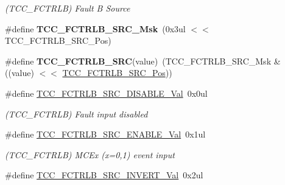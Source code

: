 \begin{DoxyCompactItemize}
\begin{DoxyCompactList}\small\item\em (T\+C\+C\+\_\+\+F\+C\+T\+R\+L\+B) Fault B Source \end{DoxyCompactList}\item 
\hypertarget{group___s_a_m_l21___t_c_c_ga2d51f76f71ee83af0772a637d77e9dd6}{}\#define {\bfseries T\+C\+C\+\_\+\+F\+C\+T\+R\+L\+B\+\_\+\+S\+R\+C\+\_\+\+Msk}~(0x3ul $<$$<$ T\+C\+C\+\_\+\+F\+C\+T\+R\+L\+B\+\_\+\+S\+R\+C\+\_\+\+Pos)\label{group___s_a_m_l21___t_c_c_ga2d51f76f71ee83af0772a637d77e9dd6}

\item 
\hypertarget{group___s_a_m_l21___t_c_c_gaa0837ed1869f63ae3826ee7302d11de3}{}\#define {\bfseries T\+C\+C\+\_\+\+F\+C\+T\+R\+L\+B\+\_\+\+S\+R\+C}(value)~(T\+C\+C\+\_\+\+F\+C\+T\+R\+L\+B\+\_\+\+S\+R\+C\+\_\+\+Msk \& ((value) $<$$<$ \hyperlink{group___s_a_m_l21___t_c_c_ga8cc27791b6546da73f032510287b61d5}{T\+C\+C\+\_\+\+F\+C\+T\+R\+L\+B\+\_\+\+S\+R\+C\+\_\+\+Pos}))\label{group___s_a_m_l21___t_c_c_gaa0837ed1869f63ae3826ee7302d11de3}

\item 
\hypertarget{group___s_a_m_l21___t_c_c_gac3c686f822e3629ffcb2554af6eb2db4}{}\#define \hyperlink{group___s_a_m_l21___t_c_c_gac3c686f822e3629ffcb2554af6eb2db4}{T\+C\+C\+\_\+\+F\+C\+T\+R\+L\+B\+\_\+\+S\+R\+C\+\_\+\+D\+I\+S\+A\+B\+L\+E\+\_\+\+Val}~0x0ul\label{group___s_a_m_l21___t_c_c_gac3c686f822e3629ffcb2554af6eb2db4}

\begin{DoxyCompactList}\small\item\em (T\+C\+C\+\_\+\+F\+C\+T\+R\+L\+B) Fault input disabled \end{DoxyCompactList}\item 
\hypertarget{group___s_a_m_l21___t_c_c_ga5e5e1f08fb8d7f78e5aa11c00637e495}{}\#define \hyperlink{group___s_a_m_l21___t_c_c_ga5e5e1f08fb8d7f78e5aa11c00637e495}{T\+C\+C\+\_\+\+F\+C\+T\+R\+L\+B\+\_\+\+S\+R\+C\+\_\+\+E\+N\+A\+B\+L\+E\+\_\+\+Val}~0x1ul\label{group___s_a_m_l21___t_c_c_ga5e5e1f08fb8d7f78e5aa11c00637e495}

\begin{DoxyCompactList}\small\item\em (T\+C\+C\+\_\+\+F\+C\+T\+R\+L\+B) M\+C\+Ex (x=0,1) event input \end{DoxyCompactList}\item 
\hypertarget{group___s_a_m_l21___t_c_c_ga72ead968f49bfe631ca868fbf4f096af}{}\#define \hyperlink{group___s_a_m_l21___t_c_c_ga72ead968f49bfe631ca868fbf4f096af}{T\+C\+C\+\_\+\+F\+C\+T\+R\+L\+B\+\_\+\+S\+R\+C\+\_\+\+I\+N\+V\+E\+R\+T\+\_\+\+Val}~0x2ul\label{group___s_a_m_l21___t_c_c_ga72ead968f49bfe631ca868fbf4f096af}


\end{DoxyCompactItemize}
